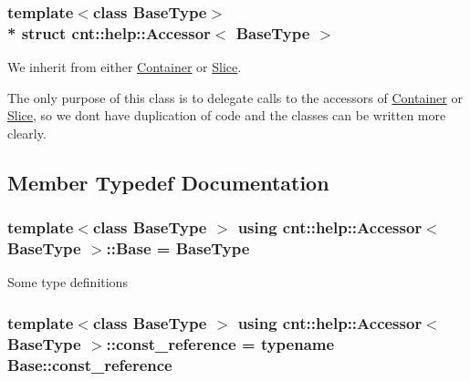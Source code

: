 \subsubsection*{template$<$class Base\+Type$>$\\*
struct cnt\+::help\+::\+Accessor$<$ Base\+Type $>$}

We inherit from either \textquotesingle{}\hyperlink{classcnt_1_1help_1_1Container}{Container}\textquotesingle{} or \textquotesingle{}\hyperlink{classcnt_1_1help_1_1Slice}{Slice}\textquotesingle{}. 

The only purpose of this class is to delegate calls to the accessors of \textquotesingle{}\hyperlink{classcnt_1_1help_1_1Container}{Container}\textquotesingle{} or \textquotesingle{}\hyperlink{classcnt_1_1help_1_1Slice}{Slice}\textquotesingle{}, so we dont have duplication of code and the classes can be written more clearly. 

\subsection{Member Typedef Documentation}
\subsubsection[{\texorpdfstring{Base}{Base}}]{\setlength{\rightskip}{0pt plus 5cm}template$<$class Base\+Type $>$ using {\bf cnt\+::help\+::\+Accessor}$<$ Base\+Type $>$\+::{\bf Base} =  Base\+Type}\hypertarget{structcnt_1_1help_1_1Accessor_a6728450f8fdeca32e8ed372b41b3467b}{}\label{structcnt_1_1help_1_1Accessor_a6728450f8fdeca32e8ed372b41b3467b}
Some type definitions 
\subsubsection[{\texorpdfstring{const\+\_\+reference}{const_reference}}]{\setlength{\rightskip}{0pt plus 5cm}template$<$class Base\+Type $>$ using {\bf cnt\+::help\+::\+Accessor}$<$ Base\+Type $>$\+::{\bf const\+\_\+reference} =  typename Base\+::const\+\_\+reference}\hypertarget{structcnt_1_1help_1_1Accessor_a8575d9de6bcb21a1bd6935d500cfcb89}{}\label{structcnt_1_1help_1_1Accessor_a8575d9de6bcb21a1bd6935d500cfcb89}

